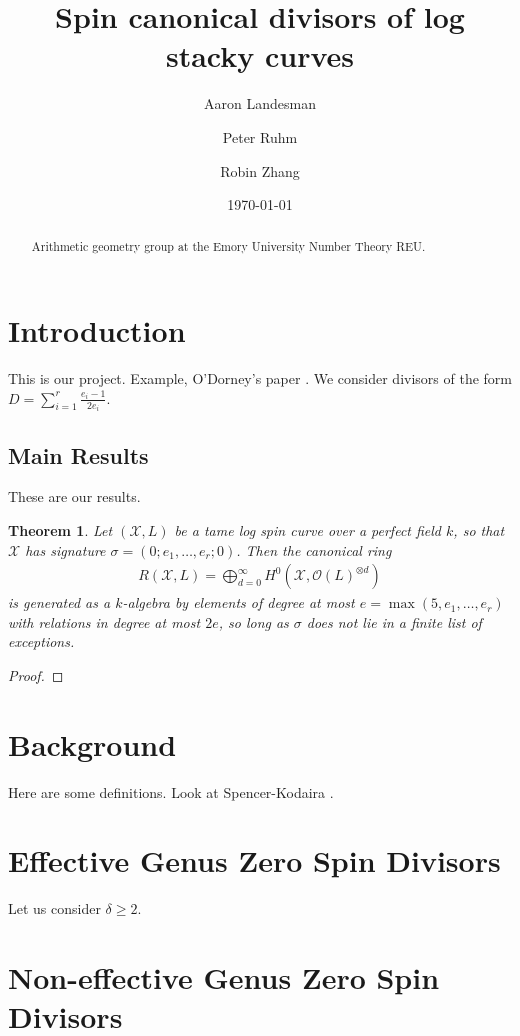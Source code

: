 \documentclass{amsart}
\title{Spin canonical divisors of log stacky curves}
\author{Aaron Landesman}
\author{Peter Ruhm}
\author{Robin Zhang}
\date{\today}
\theoremstyle{plain}
\newtheorem{thm}{Theorem}[section]
\theoremstyle{definition}
\theoremstyle{remark}
\numberwithin{equation}{section}
\newcommand \sx{\mathscr X}
\newcommand\sco{{\mathscr O}}
\newcommand \subhalf[1]{\frac{{#1} - 1}{2{#1}}}
\begin{document}
\begin{abstract}
  Arithmetic geometry group at the Emory University Number Theory
	REU.
\end{abstract}

\maketitle

\section{Introduction}
This is our project.
Example, O'Dorney's paper \cite{dorney:canonical}.
We consider divisors of the form $D = \sum_{i = 1}^{r} \subhalf{e_i}$.

\subsection{Main Results}
These are our results.
\begin{thm}
\label{thm:g_0_generators_relations}
Let $(\sx,L)$ be a tame log spin curve over a perfect field $k$, so that $\sx$ has signature $\sigma = (0;e_1,\ldots, e_r;0)$. Then the canonical ring 
\begin{align*}
	R(\sx,L) = \bigoplus_{d=0}^\infty H^0(\sx,\sco(L)^{\otimes d})
\end{align*}
is generated as a $k$-algebra by elements of degree at most $e = \max(5,e_1,\ldots, e_r)$ with relations in degree at most $2e$, so long as $\sigma$ does not lie in a finite list of exceptions. 
\end{thm}
\begin{proof}

\end{proof}


\section{Background}
Here are some definitions.
Look at Spencer-Kodaira \cite{kodaira:complex-manifolds}.

\section{Effective Genus Zero Spin Divisors}
\label{sec:g_0_effective}
Let us consider $\delta \geq 2$.

\section{Non-effective Genus Zero Spin Divisors}
\label{sec:g_0_non_effective}
\end{document}
